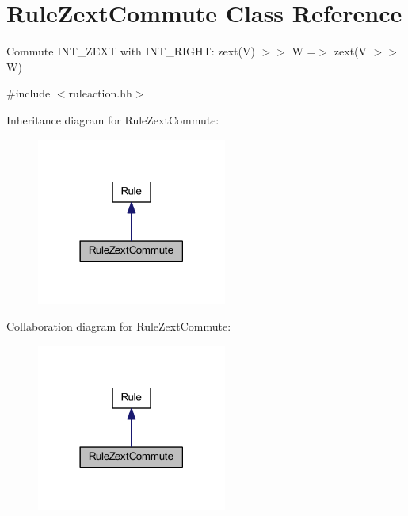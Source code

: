 \hypertarget{class_rule_zext_commute}{}\section{Rule\+Zext\+Commute Class Reference}
\label{class_rule_zext_commute}


Commute I\+N\+T\+\_\+\+Z\+E\+XT with I\+N\+T\+\_\+\+R\+I\+G\+HT\+: {\ttfamily zext(\+V) $>$$>$ W =$>$ zext(V $>$$>$ W)}  




{\ttfamily \#include $<$ruleaction.\+hh$>$}



Inheritance diagram for Rule\+Zext\+Commute\+:
\nopagebreak
\begin{figure}[H]
\begin{center}
\leavevmode
\includegraphics[width=177pt]{class_rule_zext_commute__inherit__graph}
\end{center}
\end{figure}


Collaboration diagram for Rule\+Zext\+Commute\+:
\nopagebreak
\begin{figure}[H]
\begin{center}
\leavevmode
\includegraphics[width=177pt]{class_rule_zext_commute__coll__graph}
\end{center}
\end{figure}
